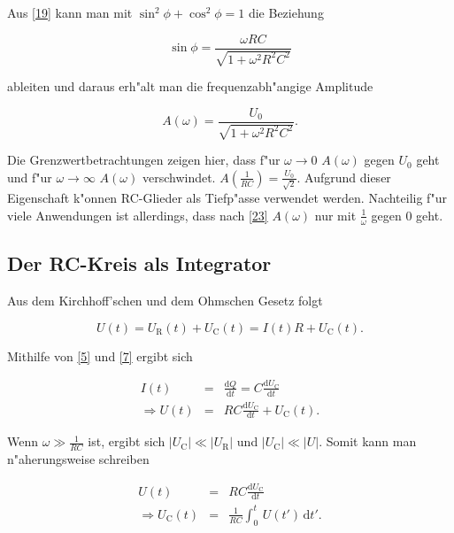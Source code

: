 \documentclass{scrartcl}
\begin{document}
			Aus \ref{19} kann man mit $\sin^2{\phi} + \cos^2{\phi} = 1$ die Beziehung

			\begin{equation}
				\sin{\phi} = \frac{\omega RC}{\sqrt{1 + \omega^2 R^2 C^2}}
			\end{equation}

			ableiten und daraus erh"alt man die frequenzabh"angige Amplitude

			\begin{equation}
				A(\omega) = \frac{U_{\mathrm{0}}}{\sqrt{1+\omega^2 R^2 C^2}} \label{23}.
			\end{equation}

			Die Grenzwertbetrachtungen zeigen hier, dass f"ur $\omega \rightarrow 0$ $A(\omega)$ gegen $U_0$ geht und f"ur $\omega \rightarrow \infty$ $A(\omega)$ verschwindet. $A(\frac{1}{RC}) = \frac{U_0}{\sqrt{2}}$. Aufgrund dieser Eigenschaft k"onnen RC-Glieder als Tiefp"asse verwendet werden. Nachteilig f"ur viele Anwendungen ist allerdings, dass nach \ref{23} $A(\omega)$ nur mit $\frac{1}{\omega}$ gegen $0$ geht.

		\subsection{Der RC-Kreis als Integrator}

			Aus dem Kirchhoff'schen und dem Ohmschen Gesetz folgt

			\begin{equation}
				U(t) = U_{\mathrm{R}}(t) + U_{\mathrm{C}}(t) = I(t)R + U_{\mathrm{C}}(t) \label{24}.
			\end{equation}

			Mithilfe von \ref{5} und \ref{7} ergibt sich

			\begin{eqnarray}
				I(t) &=& \frac{\mathrm{d}Q}{\mathrm{d}t} = C \frac{\mathrm{d}U_{\mathrm{C}}}{\mathrm{d}t}\label{25}\\
				\Rightarrow U(t) &=& RC \frac{\mathrm{d}U_{\mathrm{C}}}{\mathrm{d}t} + U_{\mathrm{C}}(t). \label{26}
			\end{eqnarray}

			Wenn $\omega \gg \frac{1}{RC}$ ist, ergibt sich $|U_{\mathrm{C}}| \ll |U_{\mathrm{R}}|$ und $|U_{\mathrm{C}}| \ll |U|$. Somit kann man n"aherungsweise schreiben

			\begin{eqnarray}
				U(t) &=& RC\frac{\mathrm{d}U_{\mathrm{C}}}{\mathrm{d}t} \label{27} \\
				\Rightarrow U_{\mathrm{C}}(t) &=& \frac{1}{RC} \int_0^t \, U(t') \, \mathrm{d}t'. \label{28}
			\end{eqnarray}
\end{document}
